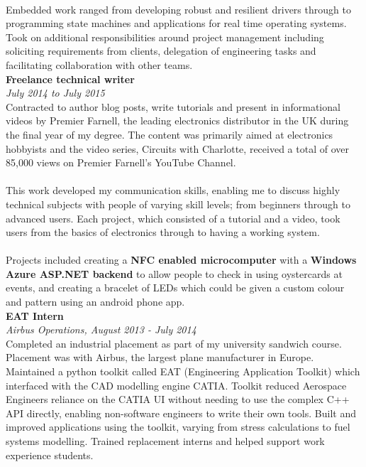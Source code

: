\documentclass{article}
\begin{document}
\begin{flushleft}
\paragraph{}Embedded work ranged from developing robust and resilient drivers through to programming state machines and applications for real time operating systems. Took on additional responsibilities around project management including soliciting requirements from clients, delegation of engineering tasks and facilitating collaboration with other teams.\\[10pt]

\textbf{Freelance technical writer}\\
\textit{July 2014 to July 2015}\\[5pt]
Contracted to author blog posts, write tutorials and present in informational videos by Premier Farnell, the leading electronics distributor in the UK during the final year of my degree. The content was primarily aimed at electronics hobbyists and the video series, Circuits with Charlotte, received a total of over 85,000 views on Premier Farnell's YouTube Channel.

\paragraph{}This work developed my communication skills, enabling me to discuss highly technical subjects with people of varying skill levels; from beginners through to advanced users. Each project, which consisted of a tutorial and a video, took users from the basics of electronics through to having a working system.

\paragraph{}Projects included creating a \textbf{NFC enabled microcomputer} with a \textbf{Windows Azure ASP.NET backend} to allow people to check in using oystercards at events, and creating a bracelet of LEDs which could be given a custom colour and pattern using an android phone app. \\[10pt]

\textbf{EAT Intern}\\
\textit{Airbus Operations, August 2013 - July 2014}\\[5pt]
Completed an industrial placement as part of my university sandwich course. Placement was with Airbus, the largest plane manufacturer in Europe. Maintained a python toolkit called EAT (Engineering Application Toolkit) which interfaced with the CAD modelling engine CATIA. Toolkit reduced Aerospace Engineers reliance on the CATIA UI without needing to use the complex C++ API directly, enabling non-software engineers to write their own tools. Built and improved applications using the toolkit, varying from stress calculations to fuel systems modelling. Trained replacement interns and helped support work experience students.


\end{flushleft}
\end{document}
